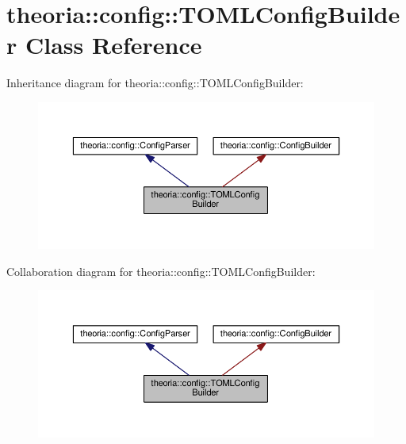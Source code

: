 \hypertarget{classtheoria_1_1config_1_1TOMLConfigBuilder}{\section{theoria\+:\+:config\+:\+:T\+O\+M\+L\+Config\+Builder Class Reference}
\label{classtheoria_1_1config_1_1TOMLConfigBuilder}
}


Inheritance diagram for theoria\+:\+:config\+:\+:T\+O\+M\+L\+Config\+Builder\+:
\nopagebreak
\begin{figure}[H]
\begin{center}
\leavevmode
\includegraphics[width=350pt]{classtheoria_1_1config_1_1TOMLConfigBuilder__inherit__graph}
\end{center}
\end{figure}


Collaboration diagram for theoria\+:\+:config\+:\+:T\+O\+M\+L\+Config\+Builder\+:
\nopagebreak
\begin{figure}[H]
\begin{center}
\leavevmode
\includegraphics[width=350pt]{classtheoria_1_1config_1_1TOMLConfigBuilder__coll__graph}
\end{center}
\end{figure}
